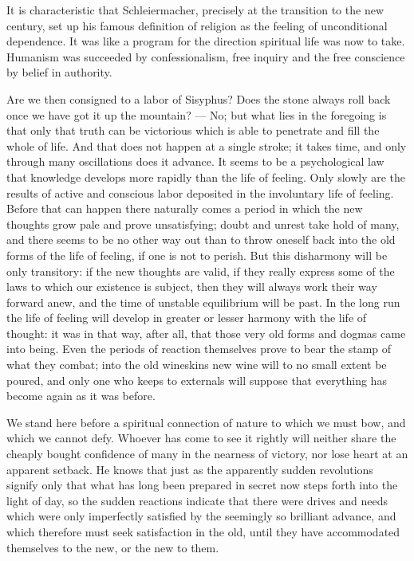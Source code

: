 \documentclass[12pt,a4paper]{article}
\begin{document}
It is characteristic that Schleiermacher, precisely at the transition to the
new century, set up his famous definition of religion as the feeling of
unconditional dependence. It was like a program for the direction spiritual
life was now to take. Humanism was succeeded by confessionalism, free inquiry
and the free conscience by belief in authority.

Are we then consigned to a labor of Sisyphus? Does the stone always roll back
once we have got it up the mountain? --- No; but what lies in the foregoing is
that only that truth can be victorious which is able to penetrate and fill the
whole of life. And that does not happen at a single stroke; it takes time, and
only through many oscillations does it advance. It seems to be a psychological
law that knowledge develops more rapidly than the life of feeling. Only slowly
are the results of active and conscious labor deposited in the involuntary life
of feeling. Before that can happen there naturally comes a period in which the
new thoughts grow pale and prove unsatisfying; doubt and unrest take hold of
many, and there seems to be no other way out than to throw oneself back into
the old forms of the life of feeling, if one is not to perish. But this
disharmony will be only transitory: if the new thoughts are valid, if they
really express some of the laws to which our existence is subject, then they
will always work their way forward anew, and the time of unstable equilibrium
will be past. In the long run the life of feeling will develop in greater or
lesser harmony with the life of thought: it was in that way, after all, that
those very old forms and dogmas came into being. Even the periods of reaction
themselves prove to bear the stamp of what they combat; into the old
wineskins new wine will to no small extent be poured, and only one who keeps
to externals will suppose that everything has become again as it was before.

We stand here before a spiritual connection of nature to which we must bow,
and which we cannot defy. Whoever has come to see it rightly will neither
share the cheaply bought confidence of many in the nearness of victory, nor
lose heart at an apparent setback. He knows that just as the apparently sudden
revolutions signify only that what has long been prepared in secret now steps
forth into the light of day, so the sudden reactions indicate that there were
drives and needs which were only imperfectly satisfied by the seemingly so
brilliant advance, and which therefore must seek satisfaction in the old,
until they have accommodated themselves to the new, or the new to them.
\end{document}
